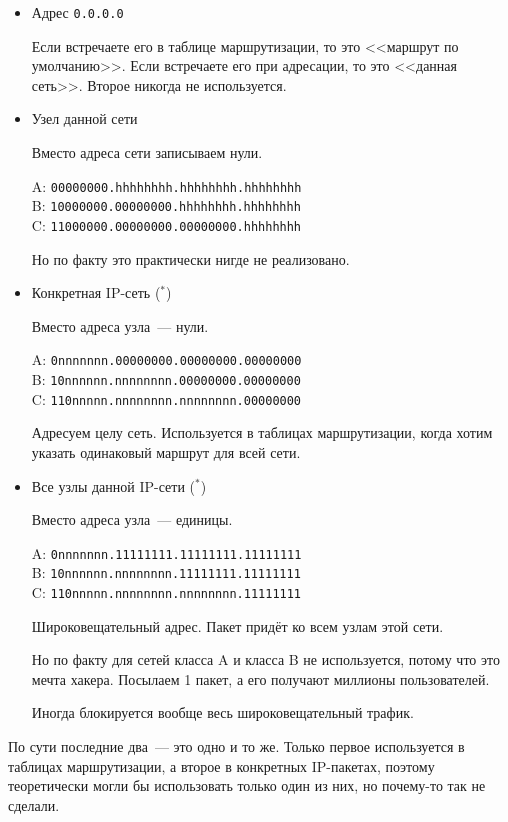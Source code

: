 \begin{itemize}
    \item Адрес {\tt 0.0.0.0}

    Если встречаете его в таблице маршрутизации, то это <<маршрут по умолчанию>>. Если встречаете его при адресации, то это <<данная сеть>>. Второе никогда не используется.
    \item Узел данной сети

    Вместо адреса сети записываем нули.

    A: {\tt 00000000.hhhhhhhh.hhhhhhhh.hhhhhhhh}\\
    B: {\tt 10000000.00000000.hhhhhhhh.hhhhhhhh}\\
    C: {\tt 11000000.00000000.00000000.hhhhhhhh}

    Но по факту это практически нигде не реализовано.

    \item Конкретная IP-сеть ($^*$)

    Вместо адреса узла~--- нули.

    A: {\tt 0nnnnnnn.00000000.00000000.00000000}\\
    B: {\tt 10nnnnnn.nnnnnnnn.00000000.00000000}\\
    C: {\tt 110nnnnn.nnnnnnnn.nnnnnnnn.00000000}

    Адресуем целу сеть. Используется в таблицах маршрутизации, когда хотим указать одинаковый маршрут для всей сети.

    \item Все узлы данной IP-сети ($^*$)

    Вместо адреса узла~--- единицы.

    A: {\tt 0nnnnnnn.11111111.11111111.11111111}\\
    B: {\tt 10nnnnnn.nnnnnnnn.11111111.11111111}\\
    C: {\tt 110nnnnn.nnnnnnnn.nnnnnnnn.11111111}

    Широковещательный адрес. Пакет придёт ко всем узлам этой сети. 

    Но по факту для сетей класса A и класса B не используется, потому что это мечта хакера. Посылаем 1 пакет, а его получают миллионы пользователей.

    Иногда блокируется вообще весь широковещательный трафик.

\end{itemize}

По сути последние два~--- это одно и то же. Только первое используется в таблицах маршрутизации, а второе в конкретных IP-пакетах, поэтому теоретически могли бы использовать только один из них, но почему-то так не сделали.

